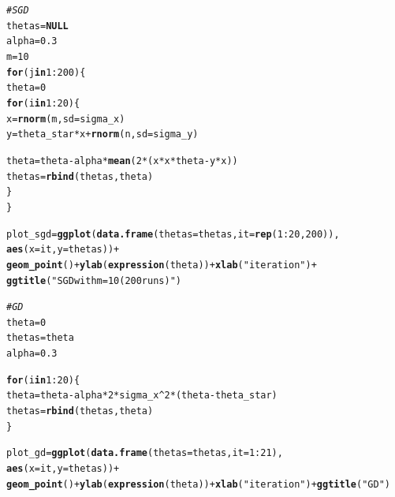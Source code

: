 \documentclass[a4paper]{article}
\makeatletter
\newcommand{\hlnum}[1]{\textcolor[rgb]{0.686,0.059,0.569}{#1}}%
\newcommand{\hlstr}[1]{\textcolor[rgb]{0.192,0.494,0.8}{#1}}%
\newcommand{\hlcom}[1]{\textcolor[rgb]{0.678,0.584,0.686}{\textit{#1}}}%
\newcommand{\hlopt}[1]{\textcolor[rgb]{0,0,0}{#1}}%
\newcommand{\hlstd}[1]{\textcolor[rgb]{0.345,0.345,0.345}{#1}}%
\newcommand{\hlkwa}[1]{\textcolor[rgb]{0.161,0.373,0.58}{\textbf{#1}}}%
\newcommand{\hlkwb}[1]{\textcolor[rgb]{0.69,0.353,0.396}{#1}}%
\newcommand{\hlkwc}[1]{\textcolor[rgb]{0.333,0.667,0.333}{#1}}%
\newcommand{\hlkwd}[1]{\textcolor[rgb]{0.737,0.353,0.396}{\textbf{#1}}}%
\newenvironment{kframe}{%
 \def\at@end@of@kframe{}%
 \ifinner\ifhmode%
  \def\at@end@of@kframe{\end{minipage}}%
  \begin{minipage}{\columnwidth}%
 \fi\fi%
 \def\FrameCommand##1{\hskip\@totalleftmargin \hskip-\fboxsep
 \colorbox{shadecolor}{##1}\hskip-\fboxsep
     \hskip-\linewidth \hskip-\@totalleftmargin \hskip\columnwidth}%
 \MakeFramed {\advance\hsize-\width
   \@totalleftmargin\z@ \linewidth\hsize
   \@setminipage}}%
 {\par\unskip\endMakeFramed%
 \at@end@of@kframe}
\newenvironment{knitrout}{}{} %
\makeatother
\begin{document}
{\begin{enumerate}
\begin{knitrout}
\begin{kframe}
\begin{alltt}
\hlcom{# SGD}
\hlstd{thetas} \hlkwb{=} \hlkwa{NULL}
\hlstd{alpha} \hlkwb{=} \hlnum{0.3}
\hlstd{m} \hlkwb{=} \hlnum{10}
\hlkwa{for}\hlstd{(j} \hlkwa{in} \hlnum{1}\hlopt{:}\hlnum{200}\hlstd{)\{}
  \hlstd{theta} \hlkwb{=} \hlnum{0}
  \hlkwa{for}\hlstd{(i} \hlkwa{in} \hlnum{1}\hlopt{:}\hlnum{20}\hlstd{)\{}
    \hlstd{x} \hlkwb{=} \hlkwd{rnorm}\hlstd{(m,} \hlkwc{sd} \hlstd{= sigma_x)}
    \hlstd{y} \hlkwb{=} \hlstd{theta_star} \hlopt{*} \hlstd{x} \hlopt{+} \hlkwd{rnorm}\hlstd{(n,} \hlkwc{sd} \hlstd{= sigma_y)}

    \hlstd{theta} \hlkwb{=} \hlstd{theta}  \hlopt{-} \hlstd{alpha} \hlopt{*} \hlkwd{mean}\hlstd{(}\hlnum{2}\hlopt{*}\hlstd{(x}\hlopt{*}\hlstd{x}\hlopt{*}\hlstd{theta} \hlopt{-} \hlstd{y}\hlopt{*}\hlstd{x))}
    \hlstd{thetas} \hlkwb{=} \hlkwd{rbind}\hlstd{(thetas, theta)}
  \hlstd{\}}
\hlstd{\}}

\hlstd{plot_sgd} \hlkwb{=} \hlkwd{ggplot}\hlstd{(}\hlkwd{data.frame}\hlstd{(}\hlkwc{thetas} \hlstd{= thetas,} \hlkwc{it} \hlstd{=} \hlkwd{rep}\hlstd{(}\hlnum{1}\hlopt{:}\hlnum{20}\hlstd{,} \hlnum{200}\hlstd{)),}
       \hlkwd{aes}\hlstd{(}\hlkwc{x} \hlstd{= it,} \hlkwc{y} \hlstd{= thetas))} \hlopt{+}
  \hlkwd{geom_point}\hlstd{()} \hlopt{+} \hlkwd{ylab}\hlstd{(}\hlkwd{expression}\hlstd{(theta))} \hlopt{+} \hlkwd{xlab}\hlstd{(}\hlstr{"iteration"}\hlstd{)} \hlopt{+}
  \hlkwd{ggtitle}\hlstd{(}\hlstr{"SGD with m=10 (200 runs)"}\hlstd{)}

\hlcom{# GD}
\hlstd{theta} \hlkwb{=} \hlnum{0}
\hlstd{thetas} \hlkwb{=} \hlstd{theta}
\hlstd{alpha} \hlkwb{=} \hlnum{0.3}

\hlkwa{for}\hlstd{(i} \hlkwa{in} \hlnum{1}\hlopt{:}\hlnum{20}\hlstd{)\{}
  \hlstd{theta} \hlkwb{=} \hlstd{theta}  \hlopt{-} \hlstd{alpha} \hlopt{*}  \hlnum{2}\hlopt{*}\hlstd{sigma_x}\hlopt{^}\hlnum{2}\hlopt{*}\hlstd{(theta} \hlopt{-} \hlstd{theta_star)}
  \hlstd{thetas} \hlkwb{=} \hlkwd{rbind}\hlstd{(thetas, theta)}
\hlstd{\}}

\hlstd{plot_gd} \hlkwb{=} \hlkwd{ggplot}\hlstd{(}\hlkwd{data.frame}\hlstd{(}\hlkwc{thetas} \hlstd{= thetas,} \hlkwc{it} \hlstd{=} \hlnum{1}\hlopt{:}\hlnum{21}\hlstd{),}
                 \hlkwd{aes}\hlstd{(}\hlkwc{x} \hlstd{= it,} \hlkwc{y} \hlstd{= thetas))} \hlopt{+}
  \hlkwd{geom_point}\hlstd{()} \hlopt{+} \hlkwd{ylab}\hlstd{(}\hlkwd{expression}\hlstd{(theta))} \hlopt{+} \hlkwd{xlab}\hlstd{(}\hlstr{"iteration"}\hlstd{)} \hlopt{+} \hlkwd{ggtitle}\hlstd{(}\hlstr{"GD"}\hlstd{)}


\end{alltt}
\end{kframe}
\end{knitrout}
\end{enumerate}}
\end{document}
